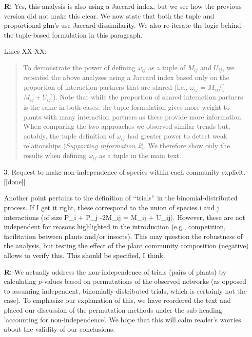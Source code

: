 \documentclass[12pt]{letter}
\newenvironment{refquote}{\bigskip \begin{it}}{\end{it}\smallskip}
\begin{document}
	\textbf{R:} Yes, this analysis is also using a Jaccard index, but we see how the previous version did not make this clear. We now state that both the tuple and proportional glm's use Jaccard dissimilarity. We also re-iterate the logic behind the tuple-based formulation in this paragraph.


		Lines XX-XX:


		\begin{quotation}

			To demonstrate the power of defining $\omega_{ij}$ as a tuple of $M_{ij}$ and $U_{ij}$, we repeated the above analyses using a Jaccard index based only on the proportion of interaction partners that are shared (i.e., $\omega_{ij}$ = $M_{ij}$/[$M_{ij}+U_{ij}$]). Note that while the proportion of shared interaction partners is the same in both cases, the tuple formulation gives more weight to plants with many interaction partners as these provide more information. When comparing the two approaches 
		    we observed similar trends but, notably, the tuple definition of $\omega_{ij}$ had greater power to detect weak relationships (\emph{Supporting information 2}). We therefore show only the results when defining $\omega_{ij}$ as a tuple in the main text.

		\end{quotation}


3. Request to make non-independence of species within each community explicit. [[done]]

	\begin{refquote}
		Another point pertains to the definition of “trials” in the binomial-distributed process. If I get it right, these correspond to the union of species i and j interactions (of size P_i + P_j -2M_ij = M_ij + U_ij). However, these are not independent for reasons highlighted in the introduction (e.g., competition, facilitation between plants and/or insects). This may question the robustness of the analysis, but testing the effect of the plant community composition (negative) allows to verify this. This should be specified, I think.
	\end{refquote}


	\textbf{R:} We actually address the non-independence of trials (pairs of plants) by calculating $p$-values based on permutations of the observed networks (as opposed to assuming independent, binomially-distributed trials, which is certainly not the case). To emphasize our explanation of this, we have reordered the text and placed our discussion of the permutation methods under the sub-heading 'accounting for non-independence'. We hope that this will calm reader's worries about the validity of our conclusions.
\end{document}
